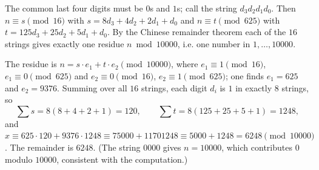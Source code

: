 The common last four digits must be $0$s and $1$s; call the string $d_3d_2d_1d_0$. Then $n\equiv s\pmod{16}$ with $s=8d_3+4d_2+2d_1+d_0$ and $n\equiv t\pmod{625}$ with $t=125d_3+25d_2+5d_1+d_0$. By the Chinese remainder theorem each of the $16$ strings gives exactly one residue $n\bmod10000$, i.e. one number in $1,\dots,10000$.

The residue is $n=s\cdot e_1+t\cdot e_2\pmod{10000}$, where $e_1\equiv1\pmod{16}$, $e_1\equiv0\pmod{625}$ and $e_2\equiv0\pmod{16}$, $e_2\equiv1\pmod{625}$; one finds $e_1=625$ and $e_2=9376$. Summing over all $16$ strings, each digit $d_i$ is $1$ in exactly $8$ strings, so
\[
\sum s=8(8+4+2+1)=120,\qquad\sum t=8(125+25+5+1)=1248,
\]
and $x\equiv625\cdot120+9376\cdot1248\equiv75000+11701248\equiv5000+1248=6248\pmod{10000}$. The remainder is $\boxed{6248}$. (The string $0000$ gives $n=10000$, which contributes $0$ modulo $10000$, consistent with the computation.)

